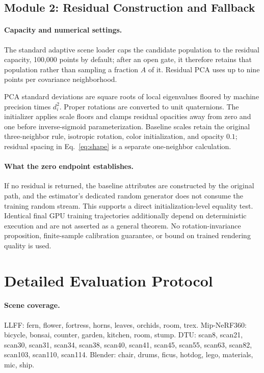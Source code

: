 \documentclass{article}
\begin{document}
\subsection{Module 2: Residual Construction and Fallback}
\label{app:initialization}

\paragraph{Capacity and numerical settings.}
The standard adaptive scene loader caps the candidate population to the residual capacity, 100,000 points by default; after an open gate, it therefore retains that population rather than sampling a fraction $A$ of it. Residual PCA uses up to nine points per covariance neighborhood.

PCA standard deviations are square roots of local eigenvalues floored by machine precision times $d_i^2$. Proper rotations are converted to unit quaternions. The initializer applies scale floors and clamps residual opacities away from zero and one before inverse-sigmoid parameterization. Baseline scales retain the original three-neighbor rule, isotropic rotation, color initialization, and opacity $0.1$; residual spacing in Eq.~\eqref{eq:shape} is a separate one-neighbor calculation.

\paragraph{What the zero endpoint establishes.}
If no residual is returned, the baseline attributes are constructed by the original path, and the estimator's dedicated random generator does not consume the training random stream. This supports a direct initialization-level equality test. Identical final GPU training trajectories additionally depend on deterministic execution and are not asserted as a general theorem. No rotation-invariance proposition, finite-sample calibration guarantee, or bound on trained rendering quality is used.

\section{Detailed Evaluation Protocol}
\label{app:protocol}

\paragraph{Scene coverage.}
LLFF: fern, flower, fortress, horns, leaves, orchids, room, trex.
Mip-NeRF360: bicycle, bonsai, counter, garden, kitchen, room, stump.
DTU: scan8, scan21, scan30, scan31, scan34, scan38, scan40, scan41, scan45, scan55, scan63, scan82, scan103, scan110, scan114.
Blender: chair, drums, ficus, hotdog, lego, materials, mic, ship.
\end{document}
